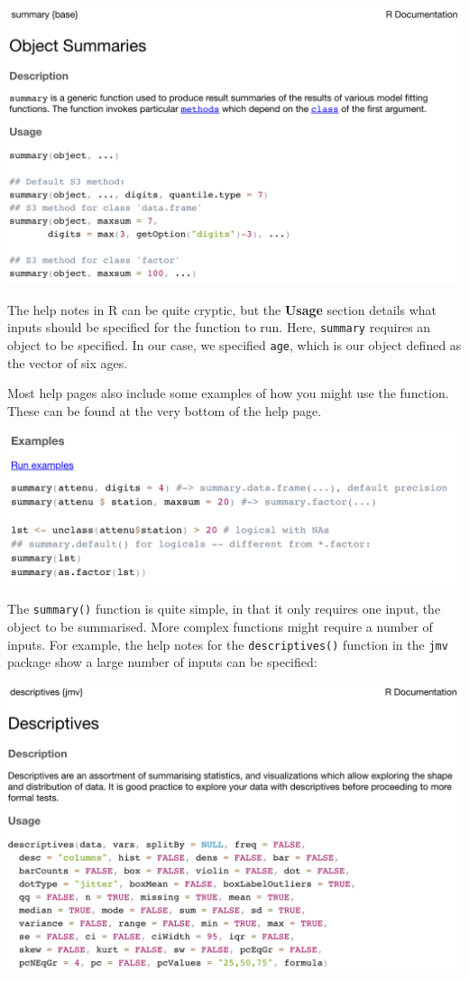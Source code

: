 \documentclass[
]{memoir}
\begin{document}
\includegraphics[width=0.8\linewidth]{img/help-1}

The help notes in R can be quite cryptic, but the \textbf{Usage} section details what inputs should be specified for the function to run. Here, \texttt{summary} requires an object to be specified. In our case, we specified \texttt{age}, which is our object defined as the vector of six ages.

Most help pages also include some examples of how you might use the function. These can be found at the very bottom of the help page.

\includegraphics[width=0.8\linewidth]{img/help-2}

The \texttt{summary()} function is quite simple, in that it only requires one input, the object to be summarised. More complex functions might require a number of inputs. For example, the help notes for the \texttt{descriptives()} function in the \texttt{jmv} package show a large number of inputs can be specified:

\includegraphics[width=0.8\linewidth]{img/help-3}
\end{document}
